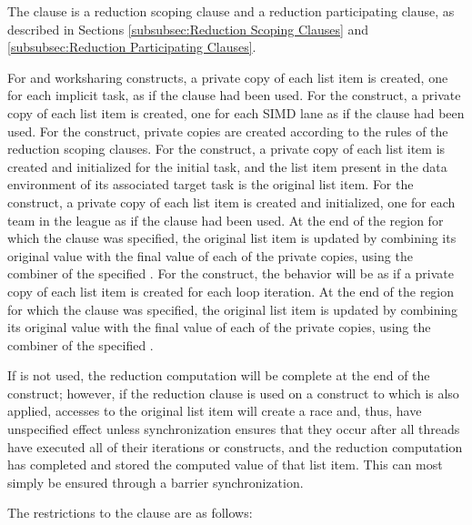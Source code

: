\descr
The  clause is a reduction scoping clause and a reduction
participating clause, as described in Sections \ref{subsubsec:Reduction Scoping
Clauses} and \ref{subsubsec:Reduction Participating Clauses}.

For  and worksharing constructs, a private copy of each list item is created,
one for each implicit task, as if the  clause had been used. For the 
construct, a private copy of each list item is created, one for each SIMD lane as if the
 clause had been used.  For the  construct,
private copies are created according to the rules of the reduction scoping
clauses.  For the  construct, a private copy of each list item is
created and initialized for the initial task, and the list item present in the
data environment of its associated target task is the original list
item. For the  construct, a private copy of each list item is
created and initialized, one for each team in the league as if the
 clause had been used. At the end of the region for  which the
 clause was specified, the original list item is updated by
combining its original value with the final value of each of the private
copies, using the combiner of the specified . For the
 construct, the behavior will be as if a private copy of each
list item is created for each loop iteration. At the end of the
region for  which the  clause was specified, the original list
item is updated by combining its original value with the final value of each of
the private copies, using the combiner of the specified
.


If  is not used, the reduction computation will be complete at the end of the
construct; however, if the reduction clause is used on a construct to which  is
also applied, accesses to the original list item will create a race and, thus, have
unspecified effect unless synchronization ensures that they occur after all threads have
executed all of their iterations or  constructs, and the reduction computation
has completed and stored the computed value of that list item. This can most simply be
ensured through a barrier synchronization.


\restrictions
The restrictions to the  clause are as follows:

